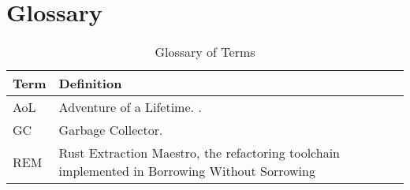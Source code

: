 \chapter*{Glossary}

\begin{table}[ht]
    \centering
    \begin{tabularx}{\textwidth}{lX}
    \toprule
    \textbf{Term} & \textbf{Definition} \\
    \midrule
    AoL   & Adventure of a Lifetime. \cite{AdventureOfALifetime}. \\
    GC    & Garbage Collector. \\
    REM   & Rust Extraction Maestro, the refactoring toolchain implemented in
    Borrowing Without Sorrowing \cite{BorrowingWithoutSorrowing} \\

    \bottomrule
    \end{tabularx}
    \caption{Glossary of Terms}
    \label{tab:glossary}
\end{table}